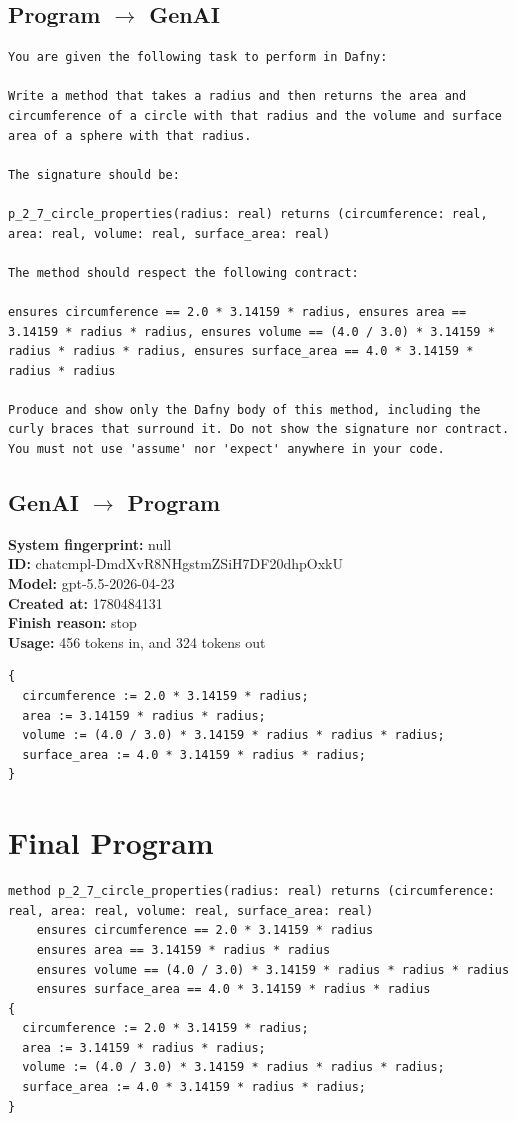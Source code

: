 \documentclass{article}
\begin{document}
\subsection*{Program $\rightarrow$ GenAI}
\begin{lstlisting}
You are given the following task to perform in Dafny:

Write a method that takes a radius and then returns the area and circumference of a circle with that radius and the volume and surface area of a sphere with that radius.

The signature should be:

p_2_7_circle_properties(radius: real) returns (circumference: real, area: real, volume: real, surface_area: real)

The method should respect the following contract:

ensures circumference == 2.0 * 3.14159 * radius, ensures area == 3.14159 * radius * radius, ensures volume == (4.0 / 3.0) * 3.14159 * radius * radius * radius, ensures surface_area == 4.0 * 3.14159 * radius * radius

Produce and show only the Dafny body of this method, including the curly braces that surround it. Do not show the signature nor contract. You must not use 'assume' nor 'expect' anywhere in your code.
\end{lstlisting}
\subsection*{GenAI $\rightarrow$ Program}
\textbf{System fingerprint: }null
\\\textbf{ID: }chatcmpl-DmdXvR8NHgstmZSiH7DF20dhpOxkU
\\\textbf{Model: }gpt-5.5-2026-04-23
\\\textbf{Created at: }1780484131
\\\textbf{Finish reason: }stop
\\\textbf{Usage: }456 tokens in, and 324 tokens out
\begin{lstlisting}
{
  circumference := 2.0 * 3.14159 * radius;
  area := 3.14159 * radius * radius;
  volume := (4.0 / 3.0) * 3.14159 * radius * radius * radius;
  surface_area := 4.0 * 3.14159 * radius * radius;
}
\end{lstlisting}
\section*{Final Program}
\begin{lstlisting}
method p_2_7_circle_properties(radius: real) returns (circumference: real, area: real, volume: real, surface_area: real)
	ensures circumference == 2.0 * 3.14159 * radius
	ensures area == 3.14159 * radius * radius
	ensures volume == (4.0 / 3.0) * 3.14159 * radius * radius * radius
	ensures surface_area == 4.0 * 3.14159 * radius * radius
{
  circumference := 2.0 * 3.14159 * radius;
  area := 3.14159 * radius * radius;
  volume := (4.0 / 3.0) * 3.14159 * radius * radius * radius;
  surface_area := 4.0 * 3.14159 * radius * radius;
}
\end{lstlisting}
\end{document}
